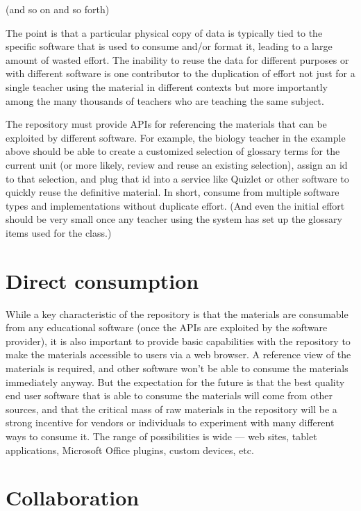 (and so on and so forth)

The point is that a particular physical copy of data is typically tied
to the specific software that is used to consume and/or format it, leading
to a large amount of wasted effort.  The inability to reuse the data for
different purposes or with different software is one contributor to the duplication of effort
not just for a single teacher using the material in different contexts but
more importantly among
the many thousands of teachers who are teaching the same subject.

The repository must provide APIs for referencing the materials that
can be exploited by different software.  For example, the biology teacher
in the example above should be able to create a customized selection of
glossary terms for the current unit (or more likely,
review and reuse an existing selection), assign an id to that selection, and
plug that id into a service like Quizlet or other software to quickly reuse
the definitive material.  In short, consume from multiple software
types and implementations without duplicate effort.  (And even the initial
effort should be very small once any teacher using the system has set
up the glossary items used for the class.)

\section*{Direct consumption}

While a key characteristic of the repository is that the materials are
consumable from any educational software (once the APIs are exploited by
the software provider), it is also important to provide
basic capabilities with the repository to make the materials accessible
to users via a web browser.  A reference view of the materials is required,
and other software won't be able to consume the materials immediately anyway.
But the expectation for the future is that the best quality end user software that is able
to consume the materials will come from other sources,
and that the critical mass of raw materials in the repository will be a
strong incentive for vendors or individuals to experiment with many different
ways to consume it.  The range of possibilities is wide --- web sites, tablet
applications, Microsoft Office plugins, custom devices, etc.

\section*{Collaboration}

